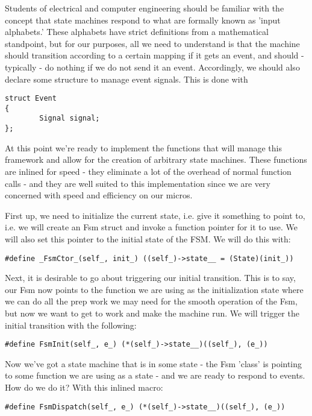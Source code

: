 Students of electrical and computer engineering should be familiar with the concept that state machines respond to what are formally known as 'input alphabets.' These alphabets have strict definitions from a mathematical standpoint, but for our purposes, all we need to understand is that the machine should transition according to a certain mapping if it gets an event, and should - typically - do nothing if we do not send it an event. Accordingly, we should also declare some structure to manage event signals. This is done with

\begin{lstlisting}
struct Event
{
        Signal signal;
};
\end{lstlisting}

At this point we're ready to implement the functions that will manage this framework and allow for the creation of arbitrary state machines. These functions are inlined for speed - they eliminate a lot of the overhead of normal function calls - and they are well suited to this implementation since we are very concerned with speed and efficiency on our micros.

First up, we need to initialize the current state, i.e. give it something to point to, i.e. we will create an Fsm struct and invoke a function pointer for it to use. We will also set this pointer to the initial state of the FSM. We will do this with:

\begin{lstlisting}
#define _FsmCtor_(self_, init_) ((self_)->state__ = (State)(init_))
\end{lstlisting}

Next, it is desirable to go about triggering our initial transition. This is to say, our Fsm now points to the function we are using as the initialization state where we can do all the prep work we may need for the smooth operation of the Fsm, but now we want to get to work and make the machine run. We will trigger the initial transition with the following:

\begin{lstlisting}
#define FsmInit(self_, e_) (*(self_)->state__)((self_), (e_))
\end{lstlisting}

Now we've got a state machine that is in some state - the Fsm 'class' is pointing to some function we are using as a state - and we are ready to respond to events. How do we do it? With this inlined macro:

\begin{lstlisting}
#define FsmDispatch(self_, e_) (*(self_)->state__)((self_), (e_))
\end{lstlisting}


